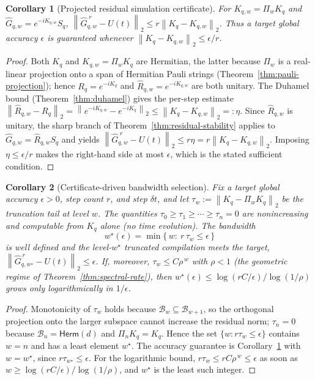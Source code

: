 \documentclass[aps,prxquantum,reprint,superscriptaddress,nofootinbib,amsmath,amssymb]{revtex4-2}
\newcommand{\norm}[1]{\left\lVert #1 \right\rVert}
\newcommand{\cB}{\mathcal{B}}
\newcommand{\dt}{\delta t}
\newtheorem{corollary}{Corollary}
\begin{document}
\begin{corollary}[Projected residual simulation certificate]
\label{cor:projected-certificate}
For $K_{q,w}=\Pi_wK_q$ and $\widehat G_{q,w}=e^{-iK_{q,w}}S_q$, $\norm{\widehat G_{q,w}^{\;r}-U(t)}_2\leq r\norm{K_q-K_{q,w}}_2$. Thus a target global accuracy $\epsilon$ is guaranteed whenever $\norm{K_q-K_{q,w}}_2\leq\epsilon/r$.
\end{corollary}

\begin{proof}
Both $K_q$ and $K_{q,w}=\Pi_wK_q$ are Hermitian, the latter because $\Pi_w$ is a real-linear projection onto a span of Hermitian Pauli strings (Theorem~\ref{thm:pauli-projection}); hence $R_q=e^{-iK_q}$ and $\widehat R_{q,w}=e^{-iK_{q,w}}$ are both unitary. The Duhamel bound (Theorem~\ref{thm:duhamel}) gives the per-step estimate $\norm{\widehat R_{q,w}-R_q}_2=\norm{e^{-iK_{q,w}}-e^{-iK_q}}_2\leq\norm{K_q-K_{q,w}}_2=:\eta$. Since $\widehat R_{q,w}$ is unitary, the sharp branch of Theorem~\ref{thm:residual-stability} applies to $\widehat G_{q,w}=\widehat R_{q,w}S_q$ and yields $\norm{\widehat G_{q,w}^{\;r}-U(t)}_2\leq r\eta=r\norm{K_q-K_{q,w}}_2$. Imposing $\eta\leq\epsilon/r$ makes the right-hand side at most $\epsilon$, which is the stated sufficient condition.
\end{proof}

\begin{corollary}[Certificate-driven bandwidth selection]
\label{cor:bandwidth}
Fix a target global accuracy $\epsilon>0$, step count $r$, and step $\dt$, and let $\tau_w:=\norm{K_q-\Pi_wK_q}_2$ be the truncation tail at level $w$. The quantities $\tau_0\geq\tau_1\geq\cdots\geq\tau_n=0$ are nonincreasing and computable from $K_q$ alone (no time evolution). The bandwidth
\begin{equation}
    w^\star(\epsilon)=\min\{\,w:\ r\,\tau_w\leq\epsilon\,\}
\end{equation}
is well defined and the level-$w^\star$ truncated compilation meets the target, $\norm{\widehat G_{q,w^\star}^{\,r}-U(t)}_2\leq\epsilon$. If, moreover, $\tau_w\leq C\rho^{\,w}$ with $\rho<1$ (the geometric regime of Theorem~\ref{thm:spectral-rate}), then $w^\star(\epsilon)\leq\log(rC/\epsilon)/\log(1/\rho)$ grows only logarithmically in $1/\epsilon$.
\end{corollary}

\begin{proof}
Monotonicity of $\tau_w$ holds because $\cB_w\subseteq\cB_{w+1}$, so the orthogonal projection onto the larger subspace cannot increase the residual norm; $\tau_n=0$ because $\cB_n=\mathsf{Herm}(d)$ and $\Pi_nK_q=K_q$. Hence the set $\{w:r\tau_w\leq\epsilon\}$ contains $w=n$ and has a least element $w^\star$. The accuracy guarantee is Corollary~\ref{cor:projected-certificate} with $w=w^\star$, since $r\tau_{w^\star}\leq\epsilon$. For the logarithmic bound, $r\tau_w\leq rC\rho^{\,w}\leq\epsilon$ as soon as $w\geq\log(rC/\epsilon)/\log(1/\rho)$, and $w^\star$ is the least such integer.
\end{proof}
\end{document}

